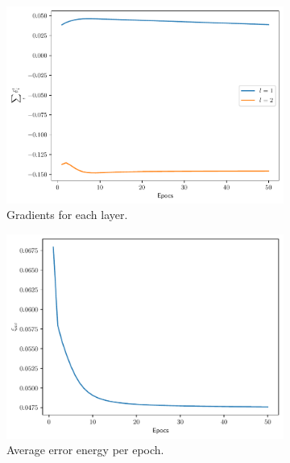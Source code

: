 \documentclass[conference]{IEEEtran}
\theoremstyle{definition}
\theoremstyle{remark}
\theoremstyle{remark}
\begin{document}
\begin{figure}
  \centering
  \begin{subfigure}[b]{0.3\textwidth}
    \centering \includegraphics[width=\textwidth]{figs/3-0.5-emb-gradients.pdf}
    \caption{Gradients for each layer.}
  \end{subfigure}
  \begin{subfigure}[b]{0.3\textwidth}
    \centering \includegraphics[width=\textwidth]{figs/3-0.5-emb-error.pdf}
    \caption{Average error energy per epoch.}
  \end{subfigure}
  \begin{subfigure}[b]{0.3\textwidth}

\end{subfigure}
\end{figure}
\end{document}

